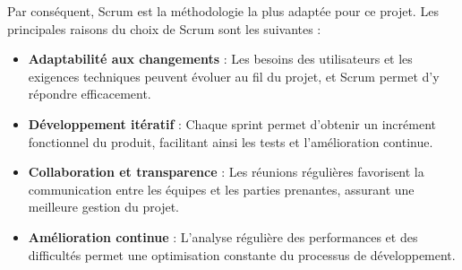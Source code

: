 Par conséquent, Scrum est la méthodologie la plus adaptée pour ce projet.
Les principales raisons du choix de Scrum sont les suivantes :
\begin{itemize}
    \item \textbf{Adaptabilité aux changements} : Les besoins des utilisateurs et les exigences techniques peuvent évoluer au fil du projet, et Scrum permet d’y répondre efficacement.
    \item \textbf{Développement itératif} : Chaque sprint permet d’obtenir un incrément fonctionnel du produit, facilitant ainsi les tests et l’amélioration continue.
    \item \textbf{Collaboration et transparence} : Les réunions régulières favorisent la communication entre les équipes et les parties prenantes, assurant une meilleure gestion du projet.
    \item \textbf{Amélioration continue} : L’analyse régulière des performances et des difficultés permet une optimisation constante du processus de développement.
\end{itemize}